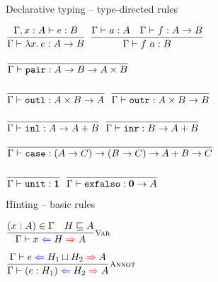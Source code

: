 \documentclass{beamer}
\begin{document}
\begin{frame}{Declarative typing -- type-directed rules}

\begin{center}
  $\displaystyle \frac{\Gamma, x : A \vdash e : B}{\Gamma \vdash \lambda x.\, e : A \to B} \textsc{\footnotesize{}}$ \quad
  $\displaystyle \frac{\Gamma \vdash a : A \quad \Gamma \vdash f : A \to B}{\Gamma \vdash f\ a : B} \textsc{\footnotesize{}}$

  \vspace{2em}

  $\displaystyle \frac{}{\Gamma \vdash \texttt{pair} : A \to B \to A \times B} \textsc{\footnotesize{}}$

  \vspace{1em}

  $\displaystyle \frac{}{\Gamma \vdash \texttt{outl} : A \times B \to A} \textsc{\footnotesize{}}$ \quad
  $\displaystyle \frac{}{\Gamma \vdash \texttt{outr} : A \times B \to B} \textsc{\footnotesize{}}$

  \vspace{2em}

  $\displaystyle \frac{}{\Gamma \vdash \texttt{inl} : A \to A + B} \textsc{\footnotesize{}}$ \quad
  $\displaystyle \frac{}{\Gamma \vdash \texttt{inr} : B \to A + B} \textsc{\footnotesize{}}$

  \vspace{2em}

  $\displaystyle \frac{}{\Gamma \vdash \texttt{case} : (A \to C) \to (B \to C) \to A + B \to C} \textsc{\footnotesize{}}$

  \vspace{2em}

  $\displaystyle \frac{}{\Gamma \vdash \texttt{unit} : \textbf{1}} \textsc{\footnotesize{}}$ \quad
  $\displaystyle \frac{}{\Gamma \vdash \texttt{exfalso} : \textbf{0} \to A} \textsc{\footnotesize{}}$
\end{center}

\end{frame}

\begin{frame}{Hinting -- basic rules}

\begin{center}
  $\infrule[Var]{\sidecond{(x : A) \in \Gamma} \quad \sidecond{\hintorder{H}{A}}}{\hinting{x}{H}{A}}$

  \vspace{2em}

  $\infrule[Annot]{\hinting{e}{\hintlub{H_1}{H_2}}{A}}{\hinting{\annot{e}{H_1}}{H_2}{A}}$
\end{center}

\end{frame}
\end{document}
